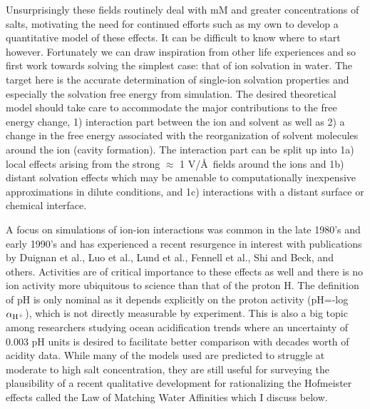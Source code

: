 \begin{intro}
    Unsurprisingly these fields routinely deal with mM and greater concentrations of salts, motivating the need for continued efforts such as my own to develop a quantitative
    model of these effects. It can be difficult to know where to start however. Fortunately we can draw inspiration from other life experiences and so first work towards solving the 
    simplest case: that of ion solvation in water\cite{duignan2014ion}. The target here is the accurate determination of single-ion solvation properties and especially the solvation
    free energy from simulation\cite{hunenberger2011sp}. The desired theoretical model should take care to accommodate the major contributions to the free energy change, 1)
    interaction part between the ion and solvent as well as 2) a change in the free energy associated with the reorganization of solvent molecules around the ion (cavity formation).
    The interaction part can be split up into 1a) local effects arising from the strong $\approx$ 1 V/\AA~fields around the ions\cite{sellner2013ionfield} and 1b) distant solvation 
    effects which may be amenable to computationally inexpensive approximations in dilute conditions, and 1c) interactions with a distant surface or chemical interface. 
    
    A focus on simulations of ion-ion interactions was common in the late 1980's and early 1990's and has experienced a recent resurgence in interest with publications by Duignan et
    al.\cite{duignan2014ion}, Luo et al.\cite{luo2013simulation}, Lund et al.\cite{lund2009dielectric}, Fennell et al.\cite{fennell2009ion}, Shi and Beck\cite{shi2017lmwa}, and others. 
    Activities are of critical importance to these effects as well and there is no ion activity more ubiquitous to science than that of the proton H\sur{+}.
    The definition of pH is only nominal as it depends explicitly on the proton activity (pH=-log $\alpha_{\mathrm{H^{\mathrm{+}}}}$), which is not directly measurable by 
    experiment\cite{guggenheim28,iupac,rockwood2015meaning}. This is also a big topic among researchers studying ocean acidification trends where an uncertainty of 0.003 pH units
    is desired to facilitate better comparison with decades worth of acidity data\cite{cao2015considerations,dickson1993measurement,dickson2015metrological}. While many of the 
    models used are predicted to struggle at moderate to high salt concentration, they are still useful for surveying the plausibility of a recent qualitative development for 
    rationalizing the Hofmeister effects called the Law of Matching Water Affinities which I discuss below.
     

\end{intro}
